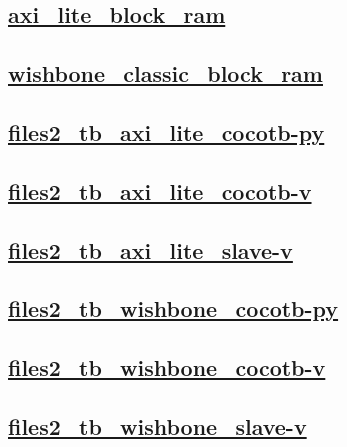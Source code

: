 \documentclass{article}
\begin{document}
  


  \subsection{\href{../files/axi_lite_block_ram-v.html}{axi\_lite\_block\_ram}}

  \subsection{\href{../files/wishbone_classic_block_ram-v.html}{wishbone\_classic\_block\_ram}}

  \subsection{\href{../files2/tb_axi_lite_cocotb-py.html}{files2\_tb\_axi\_lite\_cocotb-py}}

  \subsection{\href{../files2/tb_axi_lite_cocotb-v.html}{files2\_tb\_axi\_lite\_cocotb-v}}

  \subsection{\href{../files2/tb_axi_lite_slave-v.html}{files2\_tb\_axi\_lite\_slave-v}}

  \subsection{\href{../files2/tb_wishbone_cocotb-py.html}{files2\_tb\_wishbone\_cocotb-py}}

  \subsection{\href{../files2/tb_wishbone_cocotb-v.html}{files2\_tb\_wishbone\_cocotb-v}}

  \subsection{\href{../files2/tb_wishbone_slave-v.html}{files2\_tb\_wishbone\_slave-v}}
\end{document}
